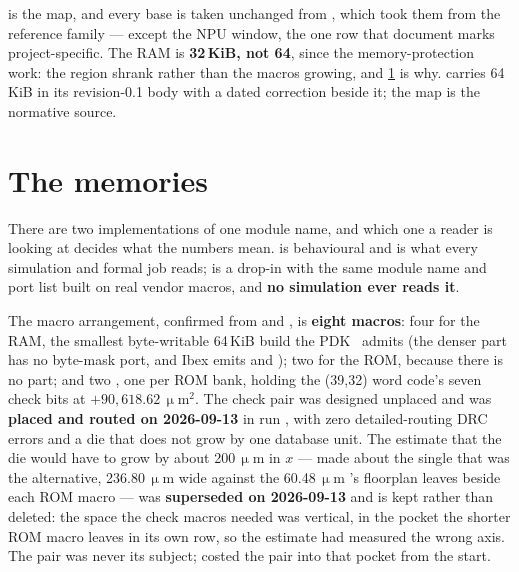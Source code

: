 \begin{sloppypar}
 is the map, and every base is taken unchanged from
, which took them from the reference family ---
except the NPU window, the one row that document marks
project-specific.  The RAM is \textbf{32\,KiB,
not 64}, since the memory-protection work: the region shrank rather than
the macros growing, and \cref{sec:arch-mem} is why.
 carries 64\,KiB in its revision-0.1 body with a
dated correction beside it; the map is the normative source.
\end{sloppypar}

\section{The memories}
\label{sec:arch-mem}

There are two implementations of one module name, and which one a reader
is looking at decides what the numbers mean.  is
behavioural and is what every simulation and formal job reads;
 is a drop-in with the same module name and port
list built on real vendor macros, and \textbf{no simulation ever reads
it}.

\begin{sloppypar}
The macro arrangement, confirmed from  and
, is \textbf{eight macros}: four
 for the RAM, the smallest
byte-writable 64\,KiB build the PDK~\cite{ihppdk} admits (the denser  part has no byte-mask port, and Ibex emits
 and ); two  for the
ROM, because there is no  part; and two
, one per ROM bank, holding the (39,32) word code's seven check bits at
$+90{,}618.62\,\upmu$m$^2$. The check pair was designed unplaced and was \textbf{placed and routed on
2026-09-13} in run , with zero detailed-routing DRC
errors and a die that does not grow by one database unit. The estimate that the die would have to grow by about 200\,$\upmu$m in
$x$ --- made about the single  that was
the alternative, 236.80\,$\upmu$m wide against the 60.48\,$\upmu$m
's floorplan leaves beside each ROM macro --- was
\textbf{superseded on 2026-09-13} and is kept rather than deleted: the
space the check macros needed was vertical, in the pocket the shorter
ROM macro leaves in its own row, so the estimate had measured the wrong
axis. The pair was never its subject;  costed the
pair into that pocket from the start.
\end{sloppypar}

